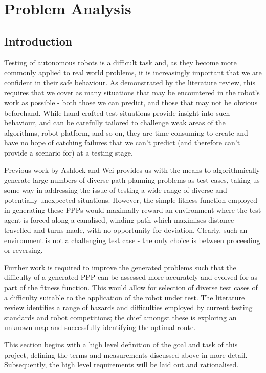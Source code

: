 \documentclass[authoryearcitations]{UoYCSproject}
\begin{document}
\chapter{Problem Analysis}
\label{cha:ProbAnalysis}
\section{Introduction}
\label{sec:pa1}
Testing of autonomous robots is a difficult task and, as they become more commonly applied to real world problems, it is increasingly important that we are confident in their safe behaviour. As demonstrated by the literature review, this requires that we cover as many situations that may be encountered in the robot’s work as possible - both those we can predict, and those that may not be obvious beforehand. While hand-crafted test situations provide insight into such behaviour, and can be carefully tailored to challenge weak areas of the algorithms, robot platform, and so on, they are time consuming to create and have no hope of catching failures that we can’t predict (and therefore can’t provide a scenario for) at a testing stage.

Previous work by Ashlock and Wei provides us with the means to algorithmically generate large numbers of diverse path planning problems as test cases, taking us some way in addressing the issue of testing a wide range of diverse and potentially unexpected situations. However, the simple fitness function employed in generating these PPPs would maximally reward an environment where the test agent is forced along a canalised, winding path which maximises distance travelled and turns made, with no opportunity for deviation. Clearly, such an environment is not a challenging test case - the only choice is between proceeding or reversing.

Further work is required to improve the generated problems such that the difficulty of a generated PPP can be assessed more accurately and evolved for as part of the fitness function. This would allow for selection of diverse test cases of a difficulty suitable to the application of the robot under test. The literature review identifies a range of hazards and difficulties employed by current testing standards and robot competitions; the chief amongst these is exploring an unknown map and successfully identifying the optimal route.

This section begins with a high level definition of the goal and task of this project, defining the terms and measurements discussed above in more detail. Subsequently, the high level requirements will be laid out and rationalised.
\end{document}
